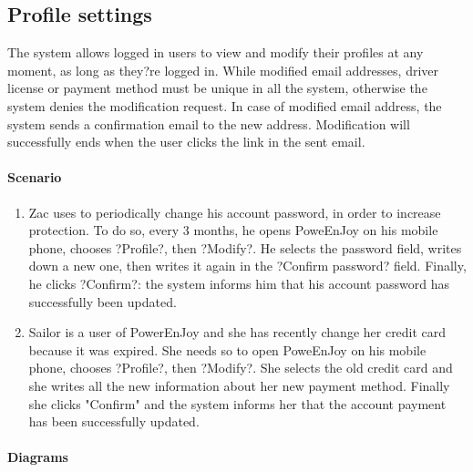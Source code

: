 \subsection{Profile settings}
The system allows logged in users to view and modify their profiles at any moment, as long as they?re logged in. While modified email addresses, driver license or payment method must be unique in all the system, otherwise the system denies the modification request. In case of modified email address, the system sends a confirmation email to the new address. Modification will successfully ends when the user clicks the link in the sent email.
\paragraph{Scenario}
\begin{enumerate}
	\item  Zac uses to periodically change his account password, in order to increase protection. To do so, every 3 months, he opens PoweEnJoy on his mobile phone, chooses ?Profile?, then ?Modify?. He selects the password field, writes down a new one, then writes it again in the ?Confirm password? field. Finally, he clicks ?Confirm?: the system informs him that his account password has successfully been updated.
	\item Sailor is a user of PowerEnJoy and she has recently change her credit card because it was expired. She needs so to open PoweEnJoy on his mobile phone, chooses ?Profile?, then ?Modify?. She selects the old credit card and she writes all the new information about her new payment method. Finally she clicks "Confirm" and the system informs her that the account payment has been successfully updated.
\end{enumerate}
\paragraph{Diagrams}
